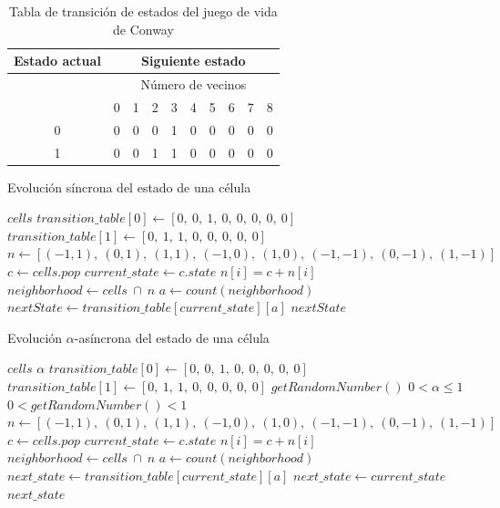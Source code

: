 \documentclass[../proyecto.tex]{memoir}
\begin{document}
\begin{table}[h]
\centering
\begin{tabular}{|l|c|c|c|c|c|c|c|c|c|}
\hline
Estado actual           & \multicolumn{9}{c|}{Siguiente estado}  \\ \hline
\multirow{2}{*}{}       & \multicolumn{9}{c|}{Número de vecinos} \\ \cline{2-10} 
                        & 0   & 1  & 2  & 3  & 4 & 5 & 6 & 7 & 8 \\ \hline
\multicolumn{1}{|c|}{0} & 0   & 0  & 0  & 1  & 0 & 0 & 0 & 0 & 0 \\ \hline
\multicolumn{1}{|c|}{1} & 0   & 0  & 1  & 1  & 0 & 0 & 0 & 0 & 0 \\ \hline
\end{tabular}
\caption{Tabla de transición de estados del juego de vida de Conway}
\label{tab:estados}
\end{table}

\begin{algorithm}
\caption{Evolución síncrona del estado de una célula}
\label{alg:normal}
\begin{algorithmic}
\REQUIRE $cells$
\REQUIRE $transition\_table[0] \leftarrow [0,\ 0,\ 1,\ 0,\ 0,\ 0,\ 0,\ 0]$
\REQUIRE $transition\_table[1] \leftarrow [0,\ 1,\ 1,\ 0,\ 0,\ 0,\ 0,\ 0]$
\STATE $n \leftarrow [(-1, 1),\ (0, 1),\ (1, 1),\ (-1, 0),\ (1, 0),\ (-1,-1),\ (0,-1),\ (1,-1)]$
\STATE $c \leftarrow cells.pop$
\STATE $current\_state \leftarrow c.state$
\STATE $n[i] = c + n[i]$
\ENDFOR
\STATE $neighborhood \leftarrow cells\ \cap\ n$
\STATE $a \leftarrow count(neighborhood)$
\STATE $nextState \leftarrow transition\_table[current\_state][a]$
\RETURN $nextState$
\end{algorithmic}
\end{algorithm}

\begin{algorithm}
\caption{Evolución $\alpha$-asíncrona del estado de una célula}
\label{alg:async}
\begin{algorithmic}
\REQUIRE $cells$
\REQUIRE $\alpha$
\REQUIRE $transition\_table[0] \leftarrow [0,\ 0,\ 1,\ 0,\ 0,\ 0,\ 0,\ 0]$
\REQUIRE $transition\_table[1] \leftarrow [0,\ 1,\ 1,\ 0,\ 0,\ 0,\ 0,\ 0]$
\REQUIRE $getRandomNumber()$
\ENSURE  $0< \alpha \leq 1$
\ENSURE $0< getRandomNumber() < 1$
\STATE $n \leftarrow [(-1, 1),\ (0, 1),\ (1, 1),\ (-1, 0),\ (1, 0),\ (-1,-1),\ (0,-1),\ (1,-1)]$
\STATE $c \leftarrow cells.pop$
\STATE $current\_state \leftarrow c.state$
\STATE $n[i] = c + n[i]$
\ENDFOR
\STATE $neighborhood \leftarrow cells\ \cap\ n$
\STATE $a \leftarrow count(neighborhood)$
\STATE $next\_state \leftarrow transition\_table[current\_state][a]$
\ELSE
\STATE $next\_state \leftarrow current\_state$
\ENDIF
\RETURN $next\_state$
\end{algorithmic}
\end{algorithm}
\end{document}
